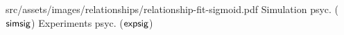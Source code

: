 
\relatplot
{src/assets/images/relationships/relationship-fit-sigmoid.pdf}
{Simulation psyc. ($\mathsf{simsig}$)}
{Experiments psyc. ($\mathsf{expsig}$)}